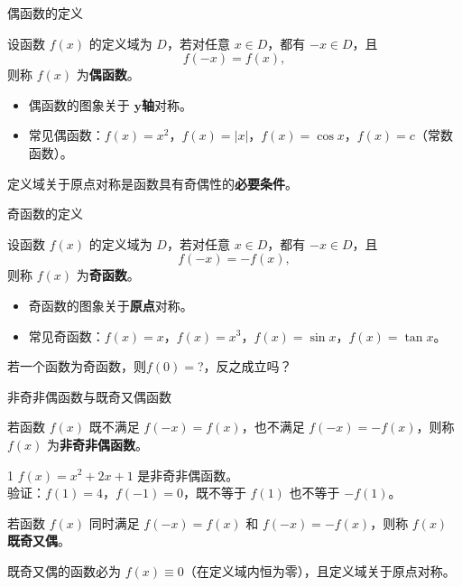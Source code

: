 \documentclass[aspectratio=169,11pt]{ctexbeamer}
\newenvironment{definition}[1][定义]{\begin{definitionbox}[#1]}{\end{definitionbox}}
\renewenvironment{definition}[1][定义]{\begin{definitionbox}[#1]}{\end{definitionbox}}
\newenvironment{theorem}[1][定理]{\begin{theorembox}[#1]}{\end{theorembox}}
\renewenvironment{theorem}[1][定理]{\begin{theorembox}[#1]}{\end{theorembox}}
\newenvironment{remark}[1][注]{\begin{remarkbox}[#1]}{\end{remarkbox}}
\renewenvironment{remark}[1][注]{\begin{remarkbox}[#1]}{\end{remarkbox}}
\newenvironment{tip}[1][提示]{\begin{tipbox}[#1]}{\end{tipbox}}
\renewenvironment{tip}[1][提示]{\begin{tipbox}[#1]}{\end{tipbox}}
\begin{document}
	\begin{frame}{偶函数的定义}
		\begin{definition}[偶函数]
			设函数 $f(x)$ 的定义域为 $D$，若对任意 $x\in D$，都有 $-x\in D$，且
			\[
			f(-x)=f(x),
			\]
			则称 $f(x)$ 为\textbf{偶函数}。
		\end{definition}
		\pause
		\begin{remark}
			\begin{itemize}
				\item 偶函数的图象关于 $\bm{y}$\textbf{轴}对称。
				\item 常见偶函数：$f(x)=x^2$，$f(x)=|x|$，$f(x)=\cos x$，$f(x)=c$（常数函数）。
			\end{itemize}
		\end{remark}
		\begin{tip}
			定义域关于原点对称是函数具有奇偶性的\textbf{必要条件}。
		\end{tip}
	\end{frame}
	
	\begin{frame}{奇函数的定义}
		\begin{definition}[奇函数]
			设函数 $f(x)$ 的定义域为 $D$，若对任意 $x\in D$，都有 $-x\in D$，且
			\[
			f(-x)=-f(x),
			\]
			则称 $f(x)$ 为\textbf{奇函数}。
		\end{definition}
		\pause
		\begin{remark}
			\begin{itemize}
				\item 奇函数的图象关于\textbf{原点}对称。
				\item 常见奇函数：$f(x)=x$，$f(x)=x^3$，$f(x)=\sin x$，$f(x)=\tan x$。
			\end{itemize}
		\end{remark}
	
	\end{frame}
	\begin{frame}
		\begin{sikao}
			若一个函数为奇函数，则$f(0)=$?，反之成立吗？
		\end{sikao}	
	\end{frame}
	\begin{frame}[allowframebreaks]{非奇非偶函数与既奇又偶函数}
		\begin{definition}[非奇非偶函数]
			若函数 $f(x)$ 既不满足 $f(-x)=f(x)$，也不满足 $f(-x)=-f(x)$，则称 $f(x)$ 为\textbf{非奇非偶函数}。
		\end{definition}
	
		\begin{example}{1}
			$f(x)=x^2+2x+1$ 是非奇非偶函数。\\
			验证：$f(1)=4$，$f(-1)=0$，既不等于 $f(1)$ 也不等于 $-f(1)$。
		\end{example}

		\begin{definition}[既奇又偶函数]
			若函数 $f(x)$ 同时满足 $f(-x)=f(x)$ 和 $f(-x)=-f(x)$，则称 $f(x)$ \textbf{既奇又偶}。
		\end{definition}

				\begin{theorem}
			既奇又偶的函数必为 $f(x)\equiv 0$（在定义域内恒为零），且定义域关于原点对称。
		\end{theorem}
	\end{frame}
\end{document}
